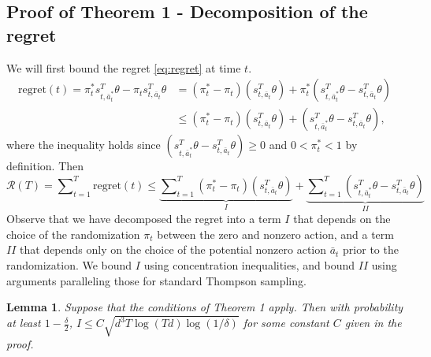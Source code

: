 \documentclass{article}
\newtheorem{lemma}{Lemma}
\begin{document}



%
\subsection{Proof of Theorem 1 - Decomposition of the regret}

We will first bound the regret \eqref{eq:regret} at time $t$. 
\begin{align}
\mathrm{regret}(t) = \pi^*_t s_{t,\bar{a}^*_t}^T \theta - \pi_t s_{t,\bar{a}_t}^T \theta
&= (\pi^*_t - \pi_t) (s_{t,\bar{a}_t}^T \theta) + \pi^*_t (s_{t,\bar{a}^*_t}^T \theta - s_{t,\bar{a}_t}^T \theta)\\
  &\leq (\pi^*_t - \pi_t) (s_{t,\bar{a}_t}^T \theta) + (s_{t,\bar{a}^*_t}^T \theta - s_{t,\bar{a}_t}^T \theta),
\end{align}
where the inequality holds since $(s_{t,\bar{a}^*_t}^T \theta - s_{t,\bar{a}_t}^T \theta) \geq 0$ and $0<\pi_t^* < 1$ by definition. Then
\[
\mathcal{R}(T) = \sum\nolimits_{t=1}^T \mathrm{regret}(t) \leq \underbrace{\sum\nolimits_{t=1}^T (\pi^*_t - \pi_t) (s_{t,\bar{a}_t}^T \theta)}_I + \underbrace{\sum\nolimits_{t=1}^T(s_{t,\bar{a}^*_t}^T \theta - s_{t,\bar{a}_t}^T \theta)}_{II}
\]
Observe that we have decomposed the regret into a term $I$ that depends on the choice of the randomization $\pi_t$ between the zero and nonzero action, and a term $II$ that depends only on the choice of the potential nonzero action $\bar{a}_t$ prior to the randomization. We bound $I$ using concentration inequalities, and bound $II$ using arguments paralleling those for standard Thompson sampling.
\begin{lemma}\label{lemm:I}
Suppose that the conditions of Theorem 1 apply. Then with probability at least $1 - \frac{\delta}{2}$, 
$
I %
\leq C  \sqrt{d^3 T \log(Td) \log(1/\delta)}
$
for some constant $C$ given in the proof.
\end{lemma}
\end{document}
